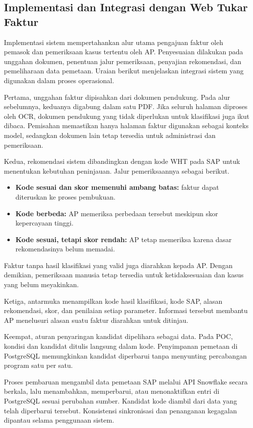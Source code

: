\subsection{Implementasi dan Integrasi dengan Web Tukar Faktur}
\label{subsec:hasil-integrasi-web-tukar-faktur}

Implementasi sistem mempertahankan alur utama pengajuan faktur oleh pemasok dan pemeriksaan kasus tertentu oleh AP. Penyesuaian dilakukan pada unggahan dokumen, penentuan jalur pemeriksaan, penyajian rekomendasi, dan pemeliharaan data pemetaan. Uraian berikut menjelaskan integrasi sistem yang digunakan dalam proses operasional.

Pertama, unggahan faktur dipisahkan dari dokumen pendukung. Pada alur sebelumnya, keduanya digabung dalam satu PDF. Jika seluruh halaman diproses oleh OCR, dokumen pendukung yang tidak diperlukan untuk klasifikasi juga ikut dibaca. Pemisahan memastikan hanya halaman faktur digunakan sebagai konteks model, sedangkan dokumen lain tetap tersedia untuk administrasi dan pemeriksaan.

Kedua, rekomendasi sistem dibandingkan dengan kode WHT pada SAP untuk menentukan kebutuhan peninjauan. Jalur pemeriksaannya sebagai berikut.
\begin{itemize}
    \item \textbf{Kode sesuai dan skor memenuhi ambang batas:} faktur dapat diteruskan ke proses pembukuan.
    \item \textbf{Kode berbeda:} AP memeriksa perbedaan tersebut meskipun skor kepercayaan tinggi.
    \item \textbf{Kode sesuai, tetapi skor rendah:} AP tetap memeriksa karena dasar rekomendasinya belum memadai.
\end{itemize}
Faktur tanpa hasil klasifikasi yang valid juga diarahkan kepada AP. Dengan demikian, pemeriksaan manusia tetap tersedia untuk ketidaksesuaian dan kasus yang belum meyakinkan.

Ketiga, antarmuka menampilkan kode hasil klasifikasi, kode SAP, alasan rekomendasi, skor, dan penilaian setiap parameter. Informasi tersebut membantu AP menelusuri alasan suatu faktur diarahkan untuk ditinjau.

Keempat, aturan penyaringan kandidat dipelihara sebagai data. Pada POC, kondisi dan kandidat ditulis langsung dalam kode. Penyimpanan pemetaan di PostgreSQL memungkinkan kandidat diperbarui tanpa menyunting percabangan program satu per satu.

Proses pembaruan mengambil data pemetaan SAP melalui API Snowflake secara berkala, lalu menambahkan, memperbarui, atau menonaktifkan entri di PostgreSQL sesuai perubahan sumber. Kandidat kode diambil dari data yang telah diperbarui tersebut. Konsistensi sinkronisasi dan penanganan kegagalan dipantau selama penggunaan sistem.
